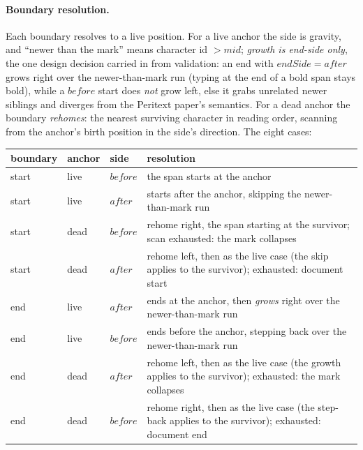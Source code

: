 \documentclass[11pt]{article}
\begin{document}
\paragraph{Boundary resolution.} Each boundary resolves to a live
position. For a live anchor the side is gravity, and ``newer than the
mark'' means character id $> \mathit{mid}$; \emph{growth is end-side
only}, the one design decision carried in from validation: an end with
$\mathit{endSide} = \mathit{after}$ grows right over the
newer-than-mark run (typing at the end of a bold span stays bold),
while a $\mathit{before}$ start does \emph{not} grow left, else it
grabs unrelated newer siblings and diverges from the Peritext paper's
semantics. For a dead anchor the boundary \emph{rehomes}: the nearest
surviving character in reading order, scanning from the anchor's birth
position in the side's direction. The eight cases:

\begin{center}\small
\begin{tabular}{@{}lllp{6.1cm}@{}}
\toprule
boundary & anchor & side & resolution \\
\midrule
start & live & $\mathit{before}$ & the span starts at the anchor \\
start & live & $\mathit{after}$ & starts after the anchor, skipping
  the newer-than-mark run \\
start & dead & $\mathit{before}$ & rehome right, the span starting at
  the survivor; scan exhausted: the mark collapses \\
start & dead & $\mathit{after}$ & rehome left, then as the live case
  (the skip applies to the survivor); exhausted: document
  start \\
end & live & $\mathit{after}$ & ends at the anchor, then \emph{grows}
  right over the newer-than-mark run \\
end & live & $\mathit{before}$ & ends before the anchor, stepping back
  over the newer-than-mark run \\
end & dead & $\mathit{after}$ & rehome left, then as the live case
  (the growth applies to the survivor); exhausted: the mark
  collapses \\
end & dead & $\mathit{before}$ & rehome right, then as the live case
  (the step-back applies to the survivor); exhausted: document
  end \\
\bottomrule
\end{tabular}
\end{center}
\end{document}
